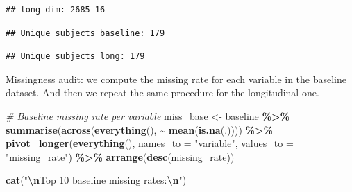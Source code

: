 \documentclass[
]{article}
\newenvironment{Shaded}{\begin{snugshade}}{\end{snugshade}}
\newcommand{\AttributeTok}[1]{\textcolor[rgb]{0.13,0.29,0.53}{#1}}
\newcommand{\CommentTok}[1]{\textcolor[rgb]{0.56,0.35,0.01}{\textit{#1}}}
\newcommand{\FunctionTok}[1]{\textcolor[rgb]{0.13,0.29,0.53}{\textbf{#1}}}
\newcommand{\NormalTok}[1]{#1}
\newcommand{\OtherTok}[1]{\textcolor[rgb]{0.56,0.35,0.01}{#1}}
\newcommand{\SpecialCharTok}[1]{\textcolor[rgb]{0.81,0.36,0.00}{\textbf{#1}}}
\newcommand{\StringTok}[1]{\textcolor[rgb]{0.31,0.60,0.02}{#1}}
\begin{document}
\begin{verbatim}
## long dim: 2685 16
\end{verbatim}

\begin{Shaded}
\end{Shaded}

\begin{verbatim}
## Unique subjects baseline: 179
\end{verbatim}

\begin{Shaded}
\end{Shaded}

\begin{verbatim}
## Unique subjects long: 179
\end{verbatim}

Missingness audit: we compute the missing rate for each variable in the
baseline dataset. And then we repeat the same procedure for the
longitudinal one.

\begin{Shaded}
\begin{Highlighting}[]
\CommentTok{\# Baseline missing rate per variable}
\NormalTok{miss\_base }\OtherTok{\textless{}{-}}\NormalTok{ baseline }\SpecialCharTok{\%\textgreater{}\%}
  \FunctionTok{summarise}\NormalTok{(}\FunctionTok{across}\NormalTok{(}\FunctionTok{everything}\NormalTok{(), }\SpecialCharTok{\textasciitilde{}} \FunctionTok{mean}\NormalTok{(}\FunctionTok{is.na}\NormalTok{(.)))) }\SpecialCharTok{\%\textgreater{}\%}
  \FunctionTok{pivot\_longer}\NormalTok{(}\FunctionTok{everything}\NormalTok{(), }\AttributeTok{names\_to =} \StringTok{"variable"}\NormalTok{, }\AttributeTok{values\_to =} \StringTok{"missing\_rate"}\NormalTok{) }\SpecialCharTok{\%\textgreater{}\%}
  \FunctionTok{arrange}\NormalTok{(}\FunctionTok{desc}\NormalTok{(missing\_rate))}

\FunctionTok{cat}\NormalTok{(}\StringTok{"}\SpecialCharTok{\textbackslash{}n}\StringTok{Top 10 baseline missing rates:}\SpecialCharTok{\textbackslash{}n}\StringTok{"}\NormalTok{)}
\end{Highlighting}
\end{Shaded}
\end{document}
